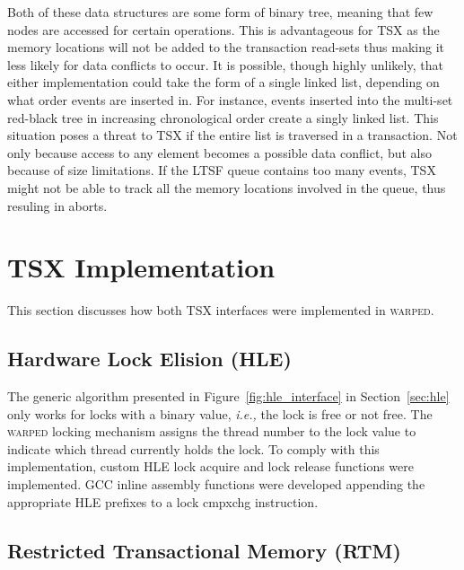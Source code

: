 \documentclass[11pt]{book}
\begin{document}

Both of these data structures are some form of binary tree, meaning that few
nodes are accessed for certain operations.  This is advantageous for TSX as the
memory locations will not be added to the transaction read-sets thus making it
less likely for data conflicts to occur.  It is possible, though highly
unlikely, that either implementation could take the form of a single linked
list, depending on what order events are inserted in.  For instance, events
inserted into the multi-set red-black tree in increasing chronological order
create a singly linked list. This situation poses a threat to TSX if the entire
list is traversed in a transaction.  Not only because access to any element
becomes a possible data conflict, but also because of size limitations.  If the
LTSF queue contains too many events, TSX might not be able to track all the memory
locations involved in the queue, thus resuling in aborts.

\section{TSX Implementation}

This section discusses how both TSX interfaces were implemented in \textsc{warped}.

\subsection{Hardware Lock Elision (HLE)}

The generic algorithm presented in Figure~\ref{fig:hle_interface} in Section~\ref{sec:hle}
only works for locks with a binary value, \emph{i.e.,} the lock is free or not free.  The
\textsc{warped} locking mechanism assigns the thread number to the lock value to indicate
which thread currently holds the lock.  To comply with this implementation, custom HLE
lock acquire and lock release functions were implemented.  GCC inline assembly functions
were developed appending the appropriate HLE prefixes to a lock cmpxchg instruction.

\subsection{Restricted Transactional Memory (RTM)}
\end{document}
